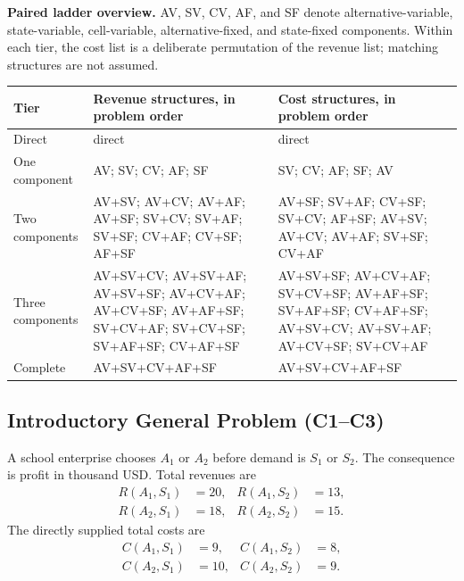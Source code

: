 \textbf{Paired ladder overview.} AV, SV, CV, AF, and SF denote
alternative-variable, state-variable, cell-variable, alternative-fixed, and
state-fixed components. Within each tier, the cost list is a deliberate
permutation of the revenue list; matching structures are not assumed.

\begin{center}
	\small
	\begin{tabularx}{\textwidth}{@{}lXX@{}}
		\toprule
		Tier
		& Revenue structures, in problem order
		& Cost structures, in problem order \\
		\midrule
		Direct
		& direct
		& direct \\
		
		One component
		& AV; SV; CV; AF; SF
		& SV; CV; AF; SF; AV \\
		
		Two components
		& AV+SV; AV+CV; AV+AF; AV+SF; SV+CV; SV+AF; SV+SF; CV+AF; CV+SF; AF+SF
		& AV+SF; SV+AF; CV+SF; SV+CV; AF+SF; AV+SV; AV+CV; AV+AF; SV+SF; CV+AF \\
		
		Three components
		& AV+SV+CV; AV+SV+AF; AV+SV+SF; AV+CV+AF; AV+CV+SF;
		AV+AF+SF; SV+CV+AF; SV+CV+SF; SV+AF+SF; CV+AF+SF
		& AV+SV+SF; AV+CV+AF; SV+CV+SF; AV+AF+SF; SV+AF+SF;
		CV+AF+SF; AV+SV+CV; AV+SV+AF; AV+CV+SF; SV+CV+AF \\
		
		Complete
		& AV+SV+CV+AF+SF
		& AV+SV+CV+AF+SF \\
		\bottomrule
	\end{tabularx}
\end{center}

\subsection{Introductory General Problem (C1--C3)}
\label{sec:problem1-introductory-general-c1-c3}

A school enterprise chooses \(A_1\) or \(A_2\) before demand is \(S_1\) or
\(S_2\). The consequence is profit in thousand USD. Total revenues are
\[
\begin{aligned}
	R(A_1,S_1)&=20,
	&
	R(A_1,S_2)&=13,
	\\
	R(A_2,S_1)&=18,
	&
	R(A_2,S_2)&=15.
\end{aligned}
\]
The directly supplied total costs are
\[
\begin{aligned}
	C(A_1,S_1)&=9,
	&
	C(A_1,S_2)&=8,
	\\
	C(A_2,S_1)&=10,
	&
	C(A_2,S_2)&=9.
\end{aligned}
\]

